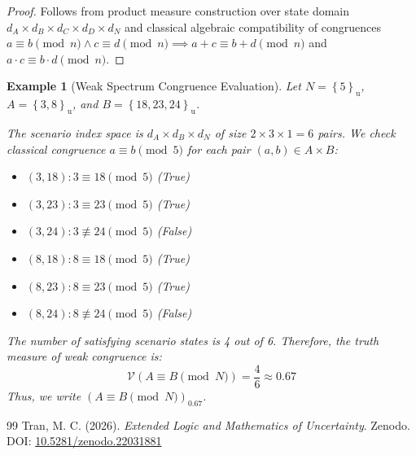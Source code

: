 \documentclass[a4paper,14pt, twoside]{memoir}
\newtheorem{example}{Example}[chapter]
\newcommand{\set}[1]{\left\{#1\right\}} %
\newcommand{\s}[1]{\set{#1}_\mathrm{u}} %
\newcommand{\ddclmd}{\mathcal{V}} %
\newcommand{\gtcl}[2]{\left(#1\right)_{#2}} %
\begin{document}
	\begin{proof}
		Follows from product measure construction over state domain $d_A \times d_B \times d_C \times d_D \times d_N$ and classical algebraic compatibility of congruences $a \equiv b \pmod n \land c \equiv d \pmod n \implies a+c \equiv b+d \pmod n$ and $a \cdot c \equiv b \cdot d \pmod n$.
	\end{proof}
	
	\begin{example}[Weak Spectrum Congruence Evaluation]
		Let $N = \s{5}$, $A = \s{3, 8}$, and $B = \s{18, 23, 24}$.
		
		The scenario index space is $d_A \times d_B \times d_N$ of size $2 \times 3 \times 1 = 6$ pairs.
		We check classical congruence $a \equiv b \pmod 5$ for each pair $(a, b) \in A \times B$:
		\begin{itemize}
			\item $(3, 18): 3 \equiv 18 \pmod 5$ (True)
			\item $(3, 23): 3 \equiv 23 \pmod 5$ (True)
			\item $(3, 24): 3 \not\equiv 24 \pmod 5$ (False)
			\item $(8, 18): 8 \equiv 18 \pmod 5$ (True)
			\item $(8, 23): 8 \equiv 23 \pmod 5$ (True)
			\item $(8, 24): 8 \not\equiv 24 \pmod 5$ (False)
		\end{itemize}
		The number of satisfying scenario states is 4 out of 6. Therefore, the truth measure of weak congruence is:
		\[
		\ddclmd(A \equiv B \pmod N) = \frac{4}{6} \approx 0.67
		\]
		Thus, we write $\gtcl{A \equiv B \pmod N}{0.67}$.
	\end{example}
	
	\begin{thebibliography}{99}
		Tran, M. C. (2026). \textit{Extended Logic and Mathematics of Uncertainty}. Zenodo. DOI:
		\href{https://doi.org/10.5281/zenodo.22031881}{10.5281/zenodo.22031881}
	\end{thebibliography}
\end{document}
